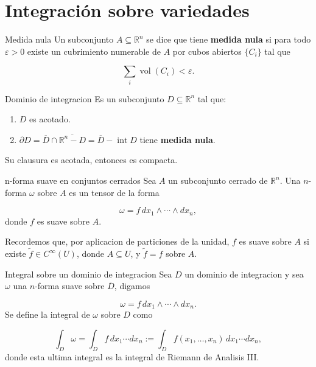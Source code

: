 \chapter{Integración sobre variedades}
\label{ch:teo-25}
\begin{bookdefinition}{Medida nula}
Un subconjunto $A\subseteq\mathbb R^n$ se dice que tiene \textbf{medida nula} si para todo $\varepsilon>0$ existe un cubrimiento numerable de $A$ por cubos abiertos $\{C_i\}$ tal que

\[
\sum_i\operatorname{vol}(C_i)<\varepsilon.
\]
\end{bookdefinition}
\begin{bookdefinition}{Dominio de integracion}
Es un subconjunto $D\subseteq\mathbb R^n$ tal que:

\begin{enumerate}
\item $D$ es acotado.
\item $\partial D=\overline D\cap\overline{\mathbb R^n-D}=\overline D-\operatorname{int}D$ tiene \textbf{medida nula}.
\end{enumerate}
Su clausura es acotada, entonces es compacta.

\end{bookdefinition}
\begin{bookdefinition}{n-forma suave en conjuntos cerrados}
Sea $A$ un subconjunto cerrado de $\mathbb R^n$. Una $n$-forma $\omega$ sobre $A$ es un tensor de la forma

\[
\omega=f\,dx_1\wedge\cdots\wedge dx_n,
\]
donde $f$ es suave sobre $A$.

Recordemos que, por aplicacion de particiones de la unidad, $f$ es suave sobre $A$ si existe $\widetilde f\in C^\infty(U)$, donde $A\subseteq U$, y $\widetilde f=f$ sobre $A$.

\end{bookdefinition}
\begin{bookdefinition}{Integral sobre un dominio de integracion}
Sea $D$ un dominio de integracion y sea $\omega$ una $n$-forma suave sobre $\overline D$, digamos

\[
\omega=f\,dx_1\wedge\cdots\wedge dx_n.
\]
Se define la integral de $\omega$ sobre $D$ como

\[
\int_D\omega=\int_D f\,dx_1\cdots dx_n:=\int_D f(x_1,\ldots,x_n)\,dx_1\cdots dx_n,
\]
donde esta ultima integral es la integral de Riemann de Analisis III.

\end{bookdefinition}
